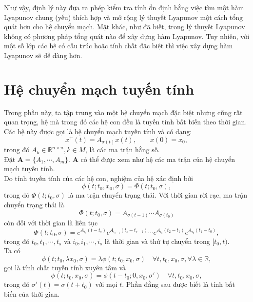 \documentclass[14pt,a4paper,oneside]{report}		%
\begin{document}
Như vậy, định lý này đưa ra phép kiểm tra tính ổn định bằng việc tìm một hàm Lyapunov chung (yếu) thích hợp và mở rộng lý thuyết Lyapunov một cách tổng quát hơn cho hệ chuyển mạch. Mặt khác, như đã biết, trong lý thuyết Lyapunov không có phương pháp tổng quát nào để xây dựng hàm Lyapunov. Tuy nhiên, với một số lớp các hệ có cấu trúc hoặc tính chất đặc biệt thì việc xây dựng hàm Lyapunov sẽ dễ dàng hơn.

\section{Hệ chuyển mạch tuyến tính}
Trong phần này, ta tập trung vào một hệ chuyển mạch đặc biệt nhưng cũng rất quan trọng, hệ mà trong đó các hệ con đều là tuyến tính bất biến theo thời gian. Các hệ này được gọi là hệ chuyển mạch tuyến tính và có dạng:
\begin{equation} \label{eq2-16}
x^+(t) = A_{\sigma (t)}x(t), \qquad x(0) = x_0,
\end{equation}
trong đó $A_k\in\mathbb{R}^{n\times n}, k\in M$, là các ma trận hằng số.\\

Đặt $\mathbf{A} = \{A_1,\cdots,A_m\}$. $\mathbf{A}$ có thể được xem như hệ các ma trận của hệ chuyển mạch tuyến tính. \\
Do tính tuyến tính của các hệ con, nghiệm của hệ xác định bởi
\begin{equation} \label{eq2-17}
\phi (t;t_0,x_0,\sigma)=\Phi (t;t_0,\sigma),
\end{equation}
trong đó $\Phi (t;t_0,\sigma)$ là ma trận chuyển trạng thái. Với thời gian rời rạc, ma trận chuyển trạng thái là
$$\Phi (t;t_0,\sigma)=A_{\sigma (t-1)}\cdots A_{\sigma (t_0)}$$
còn đối với thời gian là liên tục
$$\Phi (t;t_0,\sigma )=e^{A_{i_s}(t-t_s)}e^{A_{i_{s-1}}(t_s-t_{s-1})}\cdots e^{A_{i_1}(t_2-t_1)}e^{A_{i_0}(t_1-t_0)},$$
trong đó $t_0,t_1,\cdots ,t_s$ và $i_0,i_1,\cdots,i_s$ 
là thời gian và thứ tự chuyển trong $[t_0,t)$.\\

Ta có
\begin{equation} \label{eq2-18}
\phi (t;t_0,\lambda x_0,\sigma) = \lambda \phi (t;t_0,x_0,\sigma)\quad \forall t,t_0,x_0,\sigma , \forall \lambda\in\mathbb{R},
\end{equation}
gọi là tính chất tuyến tính xuyên tâm và
\begin{equation} \label{eq2-19}
\phi (t;t_0,x_0,\sigma) = \phi (t-t_0;0,x_0,\sigma')\quad \forall t,t_0,x_0,\sigma,
\end{equation}
trong đó $\sigma'(t)=\sigma(t+t_0)$ với mọi $t$. Phần đằng sau được biết là tính bất biến của thời gian.\\
\end{document}
